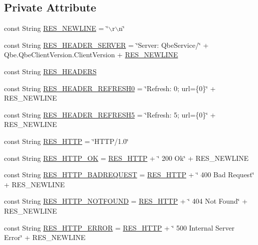 \subsection*{Private Attribute}
\begin{CompactItemize}
\item 
const String \hyperlink{classQbeSAS_1_1HttpService_QbeSAS_1_1HttpServicer0}{RES\_\-NEWLINE} = \char`\"{}$\backslash$r$\backslash$n\char`\"{}
\item 
const String \hyperlink{classQbeSAS_1_1HttpService_QbeSAS_1_1HttpServicer1}{RES\_\-HEADER\_\-SERVER} = \char`\"{}Server: Qbe\-Service/\char`\"{} + Qbe.Qbe\-Client\-Version.Client\-Version + \hyperlink{classQbeSAS_1_1HttpService_QbeSAS_1_1HttpServicer0}{RES\_\-NEWLINE}
\item 
const String \hyperlink{classQbeSAS_1_1HttpService_QbeSAS_1_1HttpServicer2}{RES\_\-HEADERS}
\item 
const String \hyperlink{classQbeSAS_1_1HttpService_QbeSAS_1_1HttpServicer3}{RES\_\-HEADER\_\-REFRESH0} = \char`\"{}Refresh: 0; url=\{0\}\char`\"{} + RES\_\-NEWLINE
\item 
const String \hyperlink{classQbeSAS_1_1HttpService_QbeSAS_1_1HttpServicer4}{RES\_\-HEADER\_\-REFRESH5} = \char`\"{}Refresh: 5; url=\{0\}\char`\"{} + RES\_\-NEWLINE
\item 
const String \hyperlink{classQbeSAS_1_1HttpService_QbeSAS_1_1HttpServicer5}{RES\_\-HTTP} = \char`\"{}HTTP/1.0\char`\"{}
\item 
const String \hyperlink{classQbeSAS_1_1HttpService_QbeSAS_1_1HttpServicer6}{RES\_\-HTTP\_\-OK} = \hyperlink{classQbeSAS_1_1HttpService_QbeSAS_1_1HttpServicer5}{RES\_\-HTTP} + \char`\"{} 200 Ok\char`\"{} + RES\_\-NEWLINE
\item 
const String \hyperlink{classQbeSAS_1_1HttpService_QbeSAS_1_1HttpServicer7}{RES\_\-HTTP\_\-BADREQUEST} = \hyperlink{classQbeSAS_1_1HttpService_QbeSAS_1_1HttpServicer5}{RES\_\-HTTP} + \char`\"{} 400 Bad Request\char`\"{} + RES\_\-NEWLINE
\item 
const String \hyperlink{classQbeSAS_1_1HttpService_QbeSAS_1_1HttpServicer8}{RES\_\-HTTP\_\-NOTFOUND} = \hyperlink{classQbeSAS_1_1HttpService_QbeSAS_1_1HttpServicer5}{RES\_\-HTTP} + \char`\"{} 404 Not Found\char`\"{} + RES\_\-NEWLINE
\item 
const String \hyperlink{classQbeSAS_1_1HttpService_QbeSAS_1_1HttpServicer9}{RES\_\-HTTP\_\-ERROR} = \hyperlink{classQbeSAS_1_1HttpService_QbeSAS_1_1HttpServicer5}{RES\_\-HTTP} + \char`\"{} 500 Internal Server Error\char`\"{} + RES\_\-NEWLINE

\end{CompactItemize}
